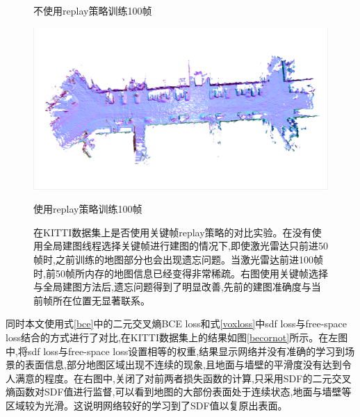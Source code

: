 \begin{figure}[htbp]
\begin{minipage}{0.5\linewidth}
        \caption*{不使用replay策略训练100帧}
	\end{minipage}\hfill
	\begin{minipage}{0.5\linewidth}
		\centering
		\includegraphics[width=1\linewidth]{figures/100o.png}
        \caption*{使用replay策略训练100帧}
	\end{minipage}
    \caption{在KITTI数据集上是否使用关键帧replay策略的对比实验。在没有使用全局建图线程选择关键帧进行建图的情况下,即使激光雷达只前进50帧时,之前训练的地图部分也会出现遗忘问题。当激光雷达前进100帧时,前50帧所内存的地图信息已经变得非常稀疏。右图使用关键帧选择与全局建图方法后,遗忘问题得到了明显改善,先前的建图准确度与当前帧所在位置无显著联系。}\label{replay}
\end{figure}

同时本文使用式\ref{bce}中的二元交叉熵BCE loss和式\ref{voxloss}中sdf loss与free-space loss结合的方式进行了对比,在KITTI数据集上的结果如图\ref{becornot}所示。在左图中,将sdf loss与free-space loss设置相等的权重,结果显示网络并没有准确的学习到场景的表面信息,部分地图区域出现不连续的现象,且地面与墙壁的平滑度没有达到令人满意的程度。在右图中,关闭了对前两者损失函数的计算,只采用SDF的二元交叉熵函数对SDF值进行监督,可以看到地图的大部份表面处于连续状态,地面与墙壁等区域较为光滑。这说明网络较好的学习到了SDF值以复原出表面。

